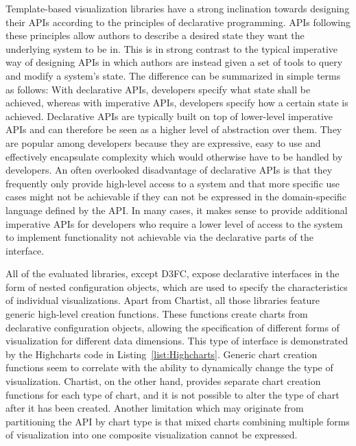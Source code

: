 Template-based visualization libraries have a strong inclination
towards designing their APIs according to the principles of
declarative programming. APIs following these principles allow authors
to describe a desired state they want the underlying system to be in.
This is in strong contrast to the typical imperative way of designing
APIs in which authors are instead given a set of tools to query and
modify a system's state. The difference can be summarized in simple
terms as follows: With declarative APIs, developers specify what state
shall be achieved, whereas with imperative APIs, developers specify
how a certain state is achieved. Declarative APIs are typically built
on top of lower-level imperative APIs and can therefore be seen as a
higher level of abstraction over them. They are popular among
developers because they are expressive, easy to use and effectively
encapsulate complexity which would otherwise have to be handled by
developers. An often overlooked disadvantage of declarative APIs is
that they frequently only provide high-level access to a system and
that more specific use cases might not be achievable if they can not
be expressed in the domain-specific language defined by the API. In
many cases, it makes sense to provide additional imperative APIs for
developers who require a lower level of access to the system to
implement functionality not achievable via the declarative parts of
the interface.

All of the evaluated libraries, except D3FC, expose declarative
interfaces in the form of nested configuration objects, which are used
to specify the characteristics of individual visualizations. Apart
from Chartist, all those libraries feature generic high-level creation
functions. These functions create charts from declarative
configuration objects, allowing the specification of different forms
of visualization for different data dimensions. This type of interface
is demonstrated by the Highcharts code in
Listing~\ref{list:Highcharts}. Generic chart creation functions seem
to correlate with the ability to dynamically change the type of
visualization. Chartist, on the other hand, provides separate chart
creation functions for each type of chart, and it is not possible to
alter the type of chart after it has been created. Another limitation
which may originate from partitioning the API by chart type is that
mixed charts combining multiple forms of visualization into one
composite visualization cannot be expressed.


\begin{samepage}
%
A basic column (vertical bar) chart defined using Highcharts' generic
chart creation API. A high-level, declarative configuration object is
passed to the creation function.
},
]{listings/highcharts.js}
\end{samepage}



